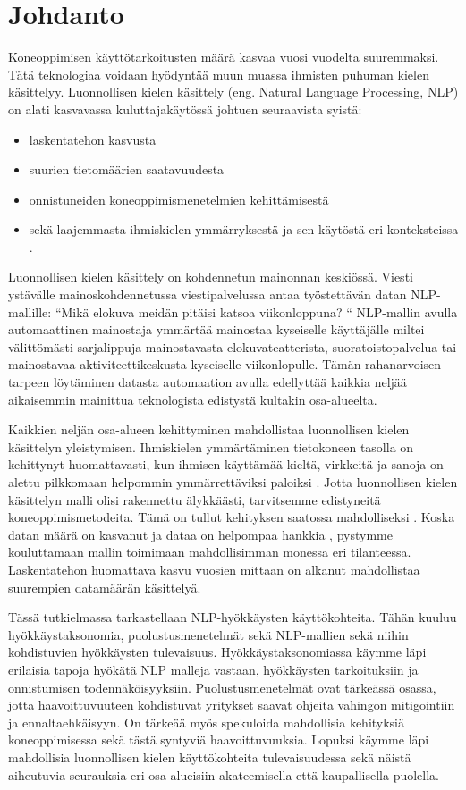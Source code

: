 \chapter{Johdanto\label{intro}}

Koneoppimisen käyttötarkoitusten määrä kasvaa vuosi vuodelta suuremmaksi. Tätä teknologiaa voidaan hyödyntää muun muassa ihmisten puhuman kielen käsittelyy. Luonnollisen kielen käsittely (eng. Natural Language Processing, NLP) on alati kasvavassa kuluttajakäytössä johtuen seuraavista syistä:
\begin{itemize}
  \item laskentatehon kasvusta
  \item suurien tietomäärien saatavuudesta
  \item onnistuneiden koneoppimismenetelmien kehittämisestä
  \item sekä laajemmasta ihmiskielen ymmärryksestä ja sen käytöstä eri konteksteissa \citep{doi:10.1126/science.aaa8685}.
\end{itemize}

Luonnollisen kielen käsittely on kohdennetun mainonnan keskiössä. Viesti ystävälle mainoskohdennetussa viestipalvelussa antaa työstettävän datan NLP-mallille: ``Mikä elokuva meidän pitäisi katsoa viikonloppuna? `` NLP-mallin avulla automaattinen mainostaja ymmärtää mainostaa kyseiselle käyttäjälle miltei välittömästi sarjalippuja mainostavasta elokuvateatterista, suoratoistopalvelua tai mainostavaa aktiviteettikeskusta kyseiselle viikonlopulle. Tämän rahanarvoisen tarpeen löytäminen datasta automaation avulla edellyttää kaikkia neljää aikaisemmin mainittua teknologista edistystä kultakin osa-alueelta.

Kaikkien neljän osa-alueen kehittyminen mahdollistaa luonnollisen kielen käsittelyn yleistymisen. Ihmiskielen ymmärtäminen tietokoneen tasolla on kehittynyt huomattavasti, kun ihmisen käyttämää kieltä, virkkeitä ja sanoja on alettu pilkkomaan helpommin ymmärrettäviksi paloiksi \citep{https://doi.org/10.1002/aris.1440370103}. Jotta luonnollisen kielen käsittelyn malli olisi rakennettu älykkäästi, tarvitsemme edistyneitä koneoppimismetodeita. Tämä on tullut kehityksen saatossa mahdolliseksi \citep{jordan2015machine}. Koska datan määrä on kasvanut ja dataa on helpompaa hankkia \citep{gopalakrishnan2018deep}, pystymme kouluttamaan mallin toimimaan mahdollisimman monessa eri tilanteessa. Laskentatehon huomattava kasvu vuosien mittaan \citep{moore1965cramming} on alkanut mahdollistaa suurempien datamäärän käsittelyä.

Tässä tutkielmassa tarkastellaan NLP-hyökkäysten käyttökohteita. Tähän kuuluu hyökkäystaksonomia, puolustusmenetelmät sekä NLP-mallien sekä niihin kohdistuvien hyökkäysten tulevaisuus. Hyökkäystaksonomiassa käymme läpi erilaisia tapoja hyökätä NLP\- malleja vastaan, hyökkäysten tarkoituksiin ja onnistumisen todennäköisyyksiin. Puolustusmenetelmät ovat tärkeässä osassa, jotta haavoittuvuuteen kohdistuvat yritykset saavat ohjeita vahingon mitigointiin ja ennaltaehkäisyyn. On tärkeää myös spekuloida mahdollisia kehityksiä koneoppimisessa sekä tästä syntyviä haavoittuvuuksia. Lopuksi käymme läpi mahdollisia luonnollisen kielen käyttökohteita tulevaisuudessa sekä näistä aiheutuvia seurauksia eri osa-alueisiin akateemisella että kaupallisella puolella.